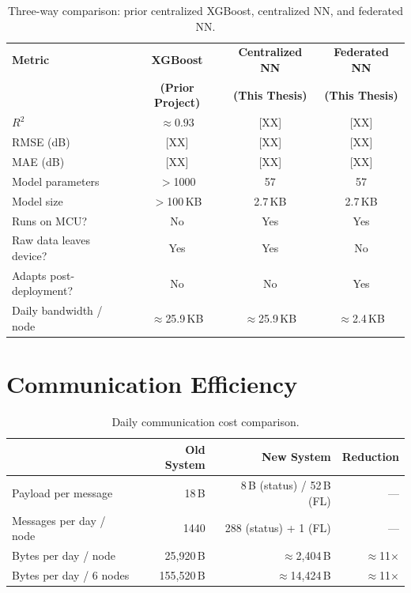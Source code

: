 \begin{table}[H]
  \centering
  \caption{Three-way comparison: prior centralized XGBoost, centralized NN, and federated NN.}
  \label{tab:three-way}
  \begin{tabular}{lccc}
    \toprule
    \textbf{Metric} &
    \textbf{XGBoost} &
    \textbf{Centralized NN} &
    \textbf{Federated NN} \\
    & \textbf{(Prior Project)} & \textbf{(This Thesis)} & \textbf{(This Thesis)} \\
    \midrule
    $R^2$                          & $\approx 0.93$ & [XX]   & [XX]   \\
    RMSE (dB)                      & [XX]           & [XX]   & [XX]   \\
    MAE (dB)                       & [XX]           & [XX]   & [XX]   \\
    Model parameters               & $>$1000        & 57     & 57     \\
    Model size                     & $>$100\,KB     & 2.7\,KB & 2.7\,KB \\
    Runs on MCU?                   & No             & Yes    & Yes    \\
    Raw data leaves device?        & Yes            & Yes    & No     \\
    Adapts post-deployment?        & No             & No     & Yes    \\
    Daily bandwidth / node         & $\approx$25.9\,KB & $\approx$25.9\,KB & $\approx$2.4\,KB \\
    \bottomrule
  \end{tabular}
\end{table}

\section{Communication Efficiency}
\label{sec:comm-efficiency}

\begin{table}[H]
  \centering
  \caption{Daily communication cost comparison.}
  \label{tab:bandwidth}
  \begin{tabular}{lrrr}
    \toprule
    & \textbf{Old System} & \textbf{New System} & \textbf{Reduction} \\
    \midrule
    Payload per message      & 18\,B       & 8\,B (status) / 52\,B (FL) & --- \\
    Messages per day / node  & 1440        & 288 (status) + 1 (FL)      & --- \\
    Bytes per day / node     & 25,920\,B   & $\approx$2,404\,B          & $\approx$11$\times$ \\
    Bytes per day / 6 nodes  & 155,520\,B  & $\approx$14,424\,B         & $\approx$11$\times$ \\
    \bottomrule
  \end{tabular}
\end{table}

